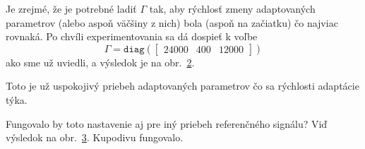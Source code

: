 \documentclass[a4paper, 10pt, ]{article}
\begin{document}
\begin{figure}[!t]
	\centering

    \vspace{-3mm}


    \vspace{-2mm}

	\caption{}
	\label{figsc_ar05_Kyvadlo_ep2_1}

    \vspace{-2mm}

\end{figure}




\begin{figure}[!b]
	\centering

    \vspace{-3mm}


    \vspace{-2mm}

	\caption{}
	\label{figsc_ar05_Kyvadlo_ep2_2}

    \vspace{-2mm}

\end{figure}




Je zrejmé, že je potrebné ladiť $\Gamma$ tak, aby rýchlosť zmeny adaptovaných parametrov (alebo aspoň väčšiny z nich) bola (aspoň na začiatku) čo najviac rovnaká. Po chvíli experimentovania sa dá dospieť k voľbe
\begin{equation*}
    \Gamma = \texttt{diag}
    \left(
    \begin{bmatrix}
        24000      & 400 & 12000
    \end{bmatrix}
    \right)
\end{equation*}
ako sme už uviedli, a výsledok je na obr.~\ref{figsc_ar05_Kyvadlo_ep2_2}.

Toto je už uspokojivý priebeh adaptovaných parametrov čo sa rýchlosti adaptácie týka.

Fungovalo by toto nastavenie aj pre iný priebeh referenčného signálu? Viď výsledok na obr.~\ref{figsc_ar05_Kyvadlo_ep2_3}. Kupodivu fungovalo.






\begin{figure}[!t]
	\centering

    \vspace{-3mm}


    \vspace{-2mm}

	\caption{}
	\label{figsc_ar05_Kyvadlo_ep2_3}

    \vspace{-2mm}

\end{figure}
\end{document}
